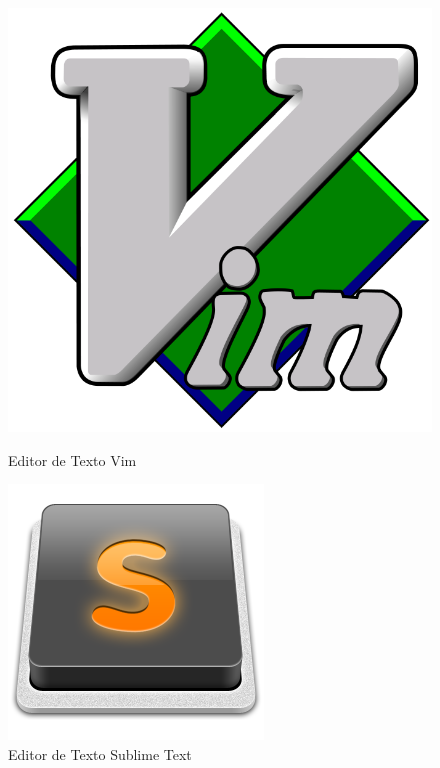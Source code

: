 \documentclass[11pt]{article}
\begin{document}
\begin{figure}[!htb]
	\centering
	\begin{minipage}{0.5\textwidth}
		\centering
		\includegraphics[scale=0.15]{logo-vim.png}
		\caption{Editor de Texto Vim}
		\label{Vim logo}
	\end{minipage}%
	\begin{minipage}{0.5\textwidth}
		\centering
		\includegraphics[scale=0.3]{logo-sublime-text.png}
		\caption{Editor de Texto Sublime Text}
		\label{Sublime Text logo}
	\end{minipage}
\end{figure}
\end{document}
